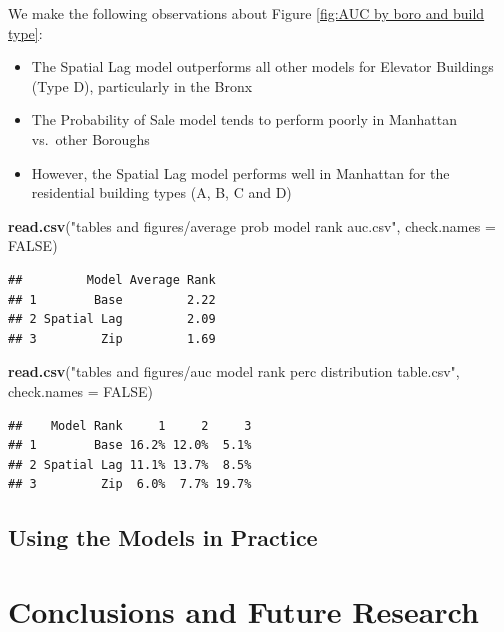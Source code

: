 \documentclass[]{article}
\newenvironment{Shaded}{\begin{snugshade}}{\end{snugshade}}
\newcommand{\KeywordTok}[1]{\textcolor[rgb]{0.13,0.29,0.53}{\textbf{#1}}}
\newcommand{\DataTypeTok}[1]{\textcolor[rgb]{0.13,0.29,0.53}{#1}}
\newcommand{\StringTok}[1]{\textcolor[rgb]{0.31,0.60,0.02}{#1}}
\newcommand{\OtherTok}[1]{\textcolor[rgb]{0.56,0.35,0.01}{#1}}
\newcommand{\NormalTok}[1]{#1}
\providecommand{\tightlist}{%
  \setlength{\itemsep}{0pt}\setlength{\parskip}{0pt}}
\begin{document}
We make the following observations about Figure
\ref{fig:AUC by boro and build type}:

\begin{itemize}
\tightlist
\item
  The Spatial Lag model outperforms all other models for Elevator
  Buildings (Type D), particularly in the Bronx
\item
  The Probability of Sale model tends to perform poorly in Manhattan
  vs.~other Boroughs
\item
  However, the Spatial Lag model performs well in Manhattan for the
  residential building types (A, B, C and D)
\end{itemize}

\begin{Shaded}
\begin{Highlighting}[]
\KeywordTok{read.csv}\NormalTok{(}\StringTok{"tables and figures/average prob model rank auc.csv"}\NormalTok{, }\DataTypeTok{check.names =} \OtherTok{FALSE}\NormalTok{)}
\end{Highlighting}
\end{Shaded}

\begin{verbatim}
##         Model Average Rank
## 1        Base         2.22
## 2 Spatial Lag         2.09
## 3         Zip         1.69
\end{verbatim}

\begin{Shaded}
\begin{Highlighting}[]
\KeywordTok{read.csv}\NormalTok{(}\StringTok{"tables and figures/auc model rank perc distribution table.csv"}\NormalTok{, }\DataTypeTok{check.names =} \OtherTok{FALSE}\NormalTok{)}
\end{Highlighting}
\end{Shaded}

\begin{verbatim}
##    Model Rank     1     2     3
## 1        Base 16.2% 12.0%  5.1%
## 2 Spatial Lag 11.1% 13.7%  8.5%
## 3         Zip  6.0%  7.7% 19.7%
\end{verbatim}

\subsection{Using the Models in
Practice}\label{using-the-models-in-practice}

\section{Conclusions and Future
Research}\label{conclusions-and-future-research}
\end{document}
